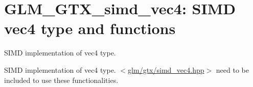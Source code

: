 \hypertarget{group__gtx__simd__vec4}{\section{\-G\-L\-M\-\_\-\-G\-T\-X\-\_\-simd\-\_\-vec4\-: \-S\-I\-M\-D vec4 type and functions}
\label{group__gtx__simd__vec4}
}


\-S\-I\-M\-D implementation of vec4 type.  


\-S\-I\-M\-D implementation of vec4 type. $<$\hyperlink{simd__vec4_8hpp}{glm/gtx/simd\-\_\-vec4.\-hpp}$>$ need to be included to use these functionalities. 